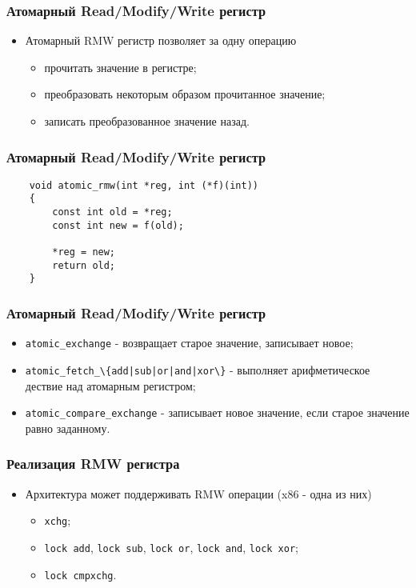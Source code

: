 \begin{frame}
\frametitle{Атомарный Read/Modify/Write регистр}
\begin{itemize}
    \item<1->Атомарный RMW регистр позволяет за одну операцию
    \begin{itemize}
        \item<2->прочитать значение в регистре;
        \item<3->преобразовать некоторым образом прочитанное значение;
        \item<4->записать преобразованное значение назад.
    \end{itemize}
\end{itemize}
\end{frame}

\begin{frame}[fragile]
\frametitle{Атомарный Read/Modify/Write регистр}
\begin{lstlisting}
    void atomic_rmw(int *reg, int (*f)(int))
    {
        const int old = *reg;
        const int new = f(old);

        *reg = new;
        return old;
    }
\end{lstlisting}
\end{frame}

\begin{frame}
\frametitle{Атомарный Read/Modify/Write регистр}
\begin{itemize}
    \item<1->\lstinline|atomic_exchange| - возвращает старое значение,
         записывает новое;
    \item<2->\lstinline;atomic_fetch_\{add|sub|or|and|xor\}; - выполняет
         арифметическое дествие над атомарным регистром;
    \item<3->\lstinline|atomic_compare_exchange| - записывает новое значение,
         если старое значение равно заданному.
\end{itemize}
\end{frame}

\begin{frame}
\frametitle{Реализация RMW регистра}
\begin{itemize}
    \item<1->Архитектура может поддерживать RMW операции (x86 - одна из них)
    \begin{itemize}
        \item<2->\lstinline|xchg|;
        \item<3->\lstinline|lock add|, \lstinline|lock sub|,
             \lstinline|lock or|, \lstinline|lock and|, \lstinline|lock xor|;
        \item<4->\lstinline|lock cmpxchg|.
    \end{itemize}
\end{itemize}
\end{frame}

